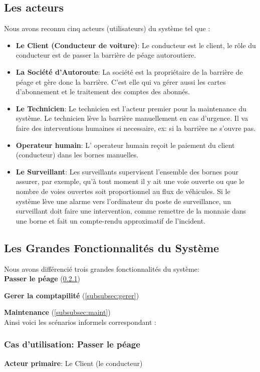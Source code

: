 \subsection{Les acteurs} 
Nous avons reconnu cinq acteurs (utilisateurs) du système tel que :
\begin{itemize}
    \item \textbf{Le Client (Conducteur de voiture)}: Le conducteur est le client, le rôle du conducteur est de passer la barrière de péage autoroutiere. 
    \item \textbf{La Société d’Autoroute}: 	La société est la propriétaire de la barrière de péage et gère donc la barrière. C’est elle qui va gérer aussi les cartes d’abonnement et le traitement des comptes des abonnés. 
    \item \textbf{Le Technicien}: Le technicien est l’acteur premier pour la maintenance du système. Le technicien lève la barrière manuellement en cas d’urgence. Il va faire des interventions humaines si necessaire, ex: si la barrière ne s’ouvre pas. 
    \item \textbf{Operateur humain}: L’ operateur humain reçoit le paiement du client (conducteur) dans les bornes manuelles.
    \item \textbf{Le Surveillant}: Les surveillants supervisent l’ensemble des bornes pour assurer, par exemple, qu’à tout moment il y ait une voie ouverte ou que le nombre de voies ouvertes soit proportionnel au flux de véhicules. Si le système lève une alarme vers l’ordinateur du poste de surveillance, un surveillant doit faire une intervention, comme remettre de la monnaie dans une borne et fait un compte-rendu approximatif de l’incident.
\end{itemize}
\newpage
\subsection{Les Grandes Fonctionnalités du Système}
Nous avons différencié trois grandes fonctionnalités du système:\\

\textbf{Passer le péage }(\ref{subsubsec:passerL})

\textbf{Gerer la comptapilité } (\ref{subsubsec:gerer})

\textbf{Maintenance }(\ref{subsubsec:maint})\\

Ainsi voici les scénarios informels correspondant :
\subsubsection{\textbf{Cas d’utilisation:} Passer le péage } \label{subsubsec:passerL} 
\textbf{Acteur primaire}: Le Client (le conducteur) 

